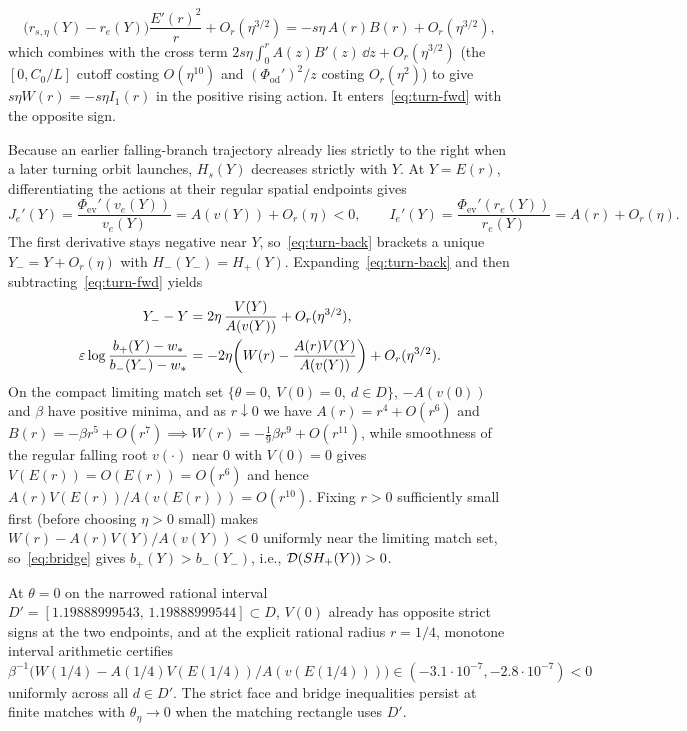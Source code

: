 \[
  \big(r_{s,\eta}(Y)-r_e(Y)\big)\frac{E'(r)^2}{r} + O_r(\eta^{3/2}) = -s\eta\,A(r)B(r) + O_r(\eta^{3/2}),
\]
which combines with the cross term $2s\eta\int_0^r A(z)B'(z)\,\dd z+O_r(\eta^{3/2})$ (the $[0,C_0/L]$ cutoff costing $O(\eta^{10})$ and $(\Phi_{\mathrm{od}}')^2/z$ costing $O_r(\eta^2)$) to give $s\eta W(r)=-s\eta I_1(r)$ in the positive rising action.
It enters~\eqref{eq:turn-fwd} with the opposite sign.

Because an earlier falling-branch trajectory already lies strictly to the right when a later turning orbit launches, $H_s(Y)$ decreases strictly with $Y$. At $Y=E(r)$, differentiating the actions at their regular spatial endpoints gives
\[
 J_e'(Y)=\frac{\Phi_{\mathrm{ev}}'(v_e(Y))}{v_e(Y)}
        =A(v(Y))+O_r(\eta)<0,\qquad
 I_e'(Y)=\frac{\Phi_{\mathrm{ev}}'(r_e(Y))}{r_e(Y)}
        =A(r)+O_r(\eta).
\]
The first derivative stays negative near $Y$, so~\eqref{eq:turn-back}
brackets a unique $Y_-=Y+O_r(\eta)$ with $H_-(Y_-)=H_+(Y)$.
Expanding~\eqref{eq:turn-back} and then subtracting~\eqref{eq:turn-fwd} yields
\begin{align}
  Y_- - Y &= 2\eta\,\frac{V(Y)}{A(v(Y))} + O_r(\eta^{3/2}),\label{eq:shift-turn}\\
  \varepsilon\log\frac{b_+(Y)-w_*}{b_-(Y_-)-w_*} &= -2\eta\!\left(W(r) - \frac{A(r)V(Y)}{A(v(Y))}\right) + O_r(\eta^{3/2}).\label{eq:bridge}
\end{align}
On the compact limiting match set $\{\theta=0,\ V(0)=0,\ d\in D\}$, $-A(v(0))$ and $\beta$ have positive minima, and as $r\downarrow 0$ we have $A(r)=r^4+O(r^6)$ and $B(r)=-\beta r^5+O(r^7)\implies W(r)=-\frac19\beta r^9+O(r^{11})$, while smoothness of the regular falling root $v(\cdot)$ near $0$ with $V(0)=0$ gives $V(E(r))=O(E(r))=O(r^6)$ and hence $A(r)V(E(r))/A(v(E(r)))=O(r^{10})$. Fixing $r>0$ sufficiently small first (before choosing $\eta>0$ small) makes $W(r)-A(r)V(Y)/A(v(Y))<0$ uniformly near the limiting match set, so~\eqref{eq:bridge} gives $b_+(Y)>b_-(Y_-)$, i.e., $\mathcal{D}(SH_+(Y))>0$.

\begin{remark}\label{rem:rational-turn}
At $\theta=0$ on the narrowed rational interval $D'=[1.19888999543,\,1.19888999544]\subset D$, $V(0)$ already has opposite strict signs at the two endpoints, and at the explicit rational radius $r=1/4$, monotone interval arithmetic certifies $\beta^{-1}\big(W(1/4)-A(1/4)V(E(1/4))/A(v(E(1/4)))\big)\in(-3.1\cdot 10^{-7},-2.8\cdot 10^{-7})<0$ uniformly across all $d\in D'$. The strict face and bridge inequalities persist at finite matches with $\theta_\eta\to0$ when the matching rectangle uses $D'$.
\end{remark}

